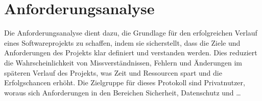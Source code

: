 \chapter{Anforderungsanalyse}




Die Anforderungsanalyse dient dazu, die Grundlage für den erfolgreichen Verlauf eines Softwareprojekts 
zu schaffen, indem sie sicherstellt, dass die Ziele und Anforderungen des Projekts klar definiert 
und verstanden werden. Dies reduziert die Wahrscheinlichkeit von Missverständnissen, Fehlern und 
Änderungen im späteren Verlauf des Projekts, was Zeit und Ressourcen spart und die Erfolgschancen erhöht.
Die Zielgruppe für dieses Protokoll sind Privatnutzer, woraus sich Anforderungen in den Bereichen Sicherheit,
Datenschutz und \dots



